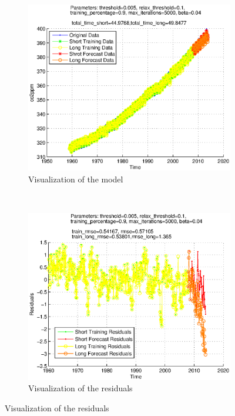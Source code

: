 \documentclass{assignment}
\begin{document}
\begin{figure}
  \centering
  \begin{subfigure}[b]{0.51\textwidth}
     \includegraphics[width=\textwidth]{images/ais_visualization_0005.eps}
  \caption{Visualization of the model}
  \end{subfigure}%
   ~ %
  \begin{subfigure}[b]{0.51\textwidth}
    \includegraphics[width=\textwidth]{images/ais_residuals_0005.eps}
  \caption{Visualization of the residuals}
  \end{subfigure}


\end{figure}
\end{document}
